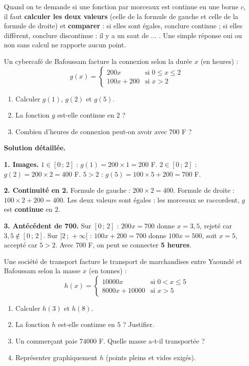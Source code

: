 \documentclass[11pt]{article}
\begin{document}
\begin{attention}
Quand on te demande si une fonction par morceaux est continue en une borne $c$, il faut \textbf{calculer les deux valeurs} (celle de la formule de gauche et celle de la formule de droite) et \textbf{comparer} : si elles sont égales, conclure \og continue \fg{} ; si elles diffèrent, conclure \og discontinue : il y a un saut de ... \fg{}. Une simple réponse \og oui \fg{} ou \og non \fg{} sans calcul ne rapporte aucun point.
\end{attention}

\begin{exoresolu}
Un cybercafé de Bafoussam facture la connexion selon la durée $x$ (en heures) :
\[
g(x) = \begin{cases}
200x & \text{si } 0 \leq x \leq 2 \\
100x + 200 & \text{si } x > 2
\end{cases}
\]
\begin{enumerate}
\item Calculer $g(1)$, $g(2)$ et $g(5)$.
\item La fonction $g$ est-elle continue en $2$ ?
\item Combien d'heures de connexion peut-on avoir avec $700$ F ?
\end{enumerate}
\tcblower
\textbf{Solution détaillée.}

\textbf{1. Images.} $1 \in [0\,;\,2]$ : $g(1) = 200 \times 1 = 200$ F. $2 \in [0\,;\,2]$ : $g(2) = 200 \times 2 = 400$ F. $5 > 2$ : $g(5) = 100 \times 5 + 200 = 700$ F.

\textbf{2. Continuité en 2.} Formule de gauche : $200 \times 2 = 400$. Formule de droite : $100 \times 2 + 200 = 400$. Les deux valeurs sont égales : les morceaux se raccordent, $g$ est \textbf{continue} en $2$.

\textbf{3. Antécédent de 700.} Sur $[0\,;\,2]$ : $200x = 700$ donne $x = 3{,}5$, rejeté car $3{,}5 \notin [0\,;\,2]$. Sur $]2\,;\,+\infty[$ : $100x + 200 = 700$ donne $100x = 500$, soit $x = 5$, accepté car $5 > 2$. Avec $700$ F, on peut se connecter \textbf{5 heures}.
\end{exoresolu}

\begin{exercice}
Une société de transport facture le transport de marchandises entre Yaoundé et Bafoussam selon la masse $x$ (en tonnes) :
\[
h(x) = \begin{cases}
10000x & \text{si } 0 < x \leq 5 \\
8000x + 10000 & \text{si } x > 5
\end{cases}
\]
\begin{enumerate}
\item Calculer $h(3)$ et $h(8)$.
\item La fonction $h$ est-elle continue en $5$ ? Justifier.
\item Un commerçant paie $74000$ F. Quelle masse a-t-il transportée ?
\item Représenter graphiquement $h$ (points pleins et vides exigés).
\end{enumerate}
\end{exercice}
\end{document}
